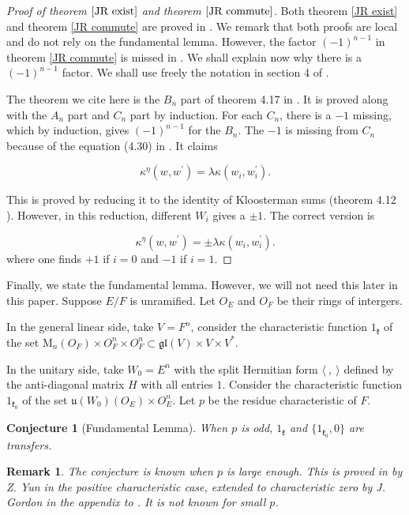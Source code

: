 \documentclass[11pt, oneside,reqno]{amsart}   	%
\newtheorem{conjecture}[theorem]{Conjecture}
\newtheorem*{remark}{Remark}
\begin{document}
\begin{proof}[Proof of theorem $\ref{JR exist}$ and theorem $\ref{JR commute}$]
Both theorem \ref{JR exist} and theorem \ref{JR commute} are proved in \cite{Wei1}. We remark that both proofs are local and do not rely on the fundamental lemma. However, the factor $(-1)^{n-1}$ in theorem \ref{JR commute} is missed in \cite{Wei1}. We shall explain now why there is a $(-1)^{n-1}$ factor. We shall use freely the notation in section 4 of \cite{Wei1}. 

The theorem we cite here is the $B_n$ part of theorem 4.17 in \cite{Wei1}. It is proved along with the $A_n$ part and $C_n$ part by induction. For each $C_n$, there is a $-1$ missing, which by induction, gives $(-1)^{n-1}$ for the $B_n$. The $-1$ is missing from $C_n$ because of the equation (4.30) in \cite{Wei1}. It claims

$$\kappa^\eta(w,w^\prime)=\lambda \kappa(w_i,w_i^\prime).$$

This is proved by reducing it to the identity of Kloosterman sums (theorem 4.12 \cite{Wei1}). However, in this reduction, different $W_i$ gives a $\pm 1$. The correct version is 

$$\kappa^\eta(w,w^\prime)=\pm \lambda \kappa(w_i,w_i^\prime).$$
where one finds $+1$ if $i=0$ and $-1$ if $i=1$.



\end{proof}

Finally, we state the fundamental lemma. However, we will not need this later in this paper. Suppose $E/F$ is unramified. Let $O_E$ and $O_F$ be their rings of intergers.

In the general linear side, take $V=F^n$, consider the characteristic function $1_{\mathfrak{k}}$ of the set M$_n(O_F) \times O_F^n \times O_F^n \subset \mathfrak{gl}(V)\times V\times V^*$.

In the unitary side, take $W_0=E^n$ with the split Hermitian form $\langle \ , \ \rangle$ defined by the anti-diagonal matrix $H$ with all entries $1$.  Consider the characteristic function $1_{\mathfrak{k}_0}$ of the set $\mathfrak{u}(W_0)(O_E) \times O_E^n$. Let $p$ be the residue characteristic of $F$. 
\begin{conjecture}[Fundamental Lemma] \label{Fundamental}
When $p$ is odd, $1_{\mathfrak{k}}$ and $\{1_{\mathfrak{k}_0},0\}$ are transfers.
\end{conjecture}
\begin{remark}
The conjecture is known when $p$ is large enough. This is proved in \cite{Yun} by Z. Yun in the positive characteristic case, extended to characteristic zero by J. Gordon in the appendix to \cite{Yun}. It is not known for small $p$.
\end{remark}
\end{document}
